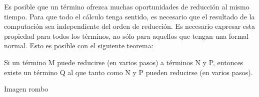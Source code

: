 Es posible que un término ofrezca muchas oportunidades de reducción al mismo tiempo. Para que todo el cálculo tenga sentido, es necesario que el resultado de la computación sea independiente del orden de reducción. Es necesario expresar esta propiedad para todos los términos, no sólo para aquellos que tengan una formal normal. Esto es posible con el siguiente teorema:

\begin{theorem}
Si un término M puede reducirse (en varios pasos) a términos N y P, entonces existe un término Q al que tanto como N y P pueden reducirse (en varios pasos).
\end{theorem}

Imagen rombo











